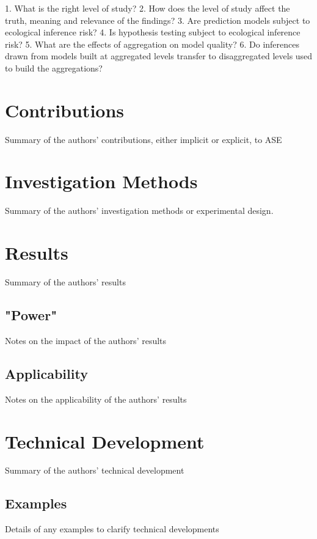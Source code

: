\documentclass[12pt]{article}
\begin{document}
1. What is the right level of study?
2. How does the level of study affect the truth, meaning and relevance of the findings?
3. Are prediction models subject to ecological inference risk?
4. Is hypothesis testing subject to ecological inference risk?
5. What are the effects of aggregation on model quality?
6. Do inferences drawn from models built at aggregated levels transfer to disaggregated levels used to build the aggregations?



\section{Contributions}\label{contrib}
Summary of the authors' contributions, either implicit or explicit, to ASE

\section{Investigation Methods}\label{invest}
Summary of the authors' investigation methods or experimental design.

\section{Results}\label{results}
Summary of the authors' results

\subsection{"Power"}\label{results-power}
Notes on the impact of the authors' results

\subsection{Applicability}\label{results-apply}
Notes on the applicability of the authors' results

\section{Technical Development}\label{tech}
Summary of the authors' technical development

\subsection{Examples}\label{tech-examples}
Details of any examples to clarify technical developments



\end{document}
